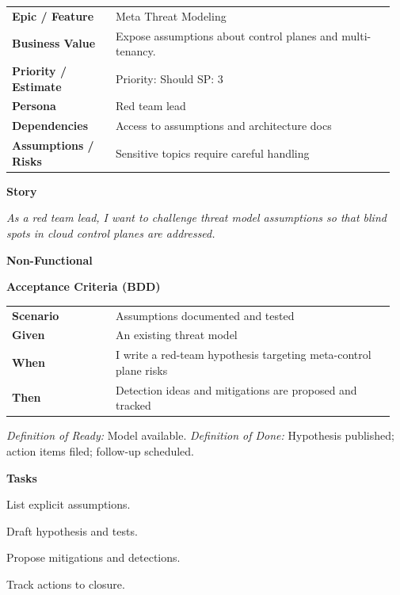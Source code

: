 \documentclass[11pt,letterpaper]{article}
\makeatletter
\newenvironment{kvtable}{%
  \par\noindent\begin{tabular}{@{}>{\raggedright\bfseries\arraybackslash}p{0.26\linewidth} >{\raggedright\arraybackslash}p{0.70\linewidth}@{}}
}{\end{tabular}\par}
\newenvironment{bdd}{%
  \par\noindent\begin{tabular}{@{}>{\raggedright\bfseries\arraybackslash}p{0.26\linewidth} >{\raggedright\arraybackslash}p{0.70\linewidth}@{}}
}{\end{tabular}\par}
\newcommand{\DoRDoD}[2]{%
  \vspace{0.35em}
  {\footnotesize\color{Muted}%
    \textit{Definition of Ready:} #1 \; \textbullet\;
    \textit{Definition of Done:} #2%
  }%
}
\newenvironment{storycard}[2]{%
  \begin{tcolorbox}[cloudcard, title={#1 --- #2}]%
}{\end{tcolorbox}}
\newcommand{\sectionlabel}[1]{\par\vspace{0.35em}\textbf{#1}\par}
\makeatother
\begin{document}
\begin{storycard}{CCS-33}{Ch. 33 — Critical Analysis of Threat Models}
\begin{kvtable}
Epic / Feature & Meta Threat Modeling\\
Business Value & Expose assumptions about control planes and multi-tenancy.\\
Priority / Estimate & Priority: Should \quad SP: 3\\
Persona & Red team lead\\
Dependencies & Access to assumptions and architecture docs\\
Assumptions / Risks & Sensitive topics require careful handling\\
\end{kvtable}
\sectionlabel{Story}
\textit{As a red team lead, I want to challenge threat model assumptions so that blind spots in cloud control planes are addressed.}
\sectionlabel{Non-Functional}\;
\sectionlabel{Acceptance Criteria (BDD)}
\begin{bdd}
Scenario & Assumptions documented and tested\\
Given & An existing threat model\\
When & I write a red-team hypothesis targeting meta-control plane risks\\
Then & Detection ideas and mitigations are proposed and tracked\\
\end{bdd}
\DoRDoD{Model available.}{Hypothesis published; action items filed; follow-up scheduled.}
\sectionlabel{Tasks}
\begin{checklist}
\item List explicit assumptions.
\item Draft hypothesis and tests.
\item Propose mitigations and detections.
\item Track actions to closure.
\end{checklist}
\end{storycard}
\end{document}
